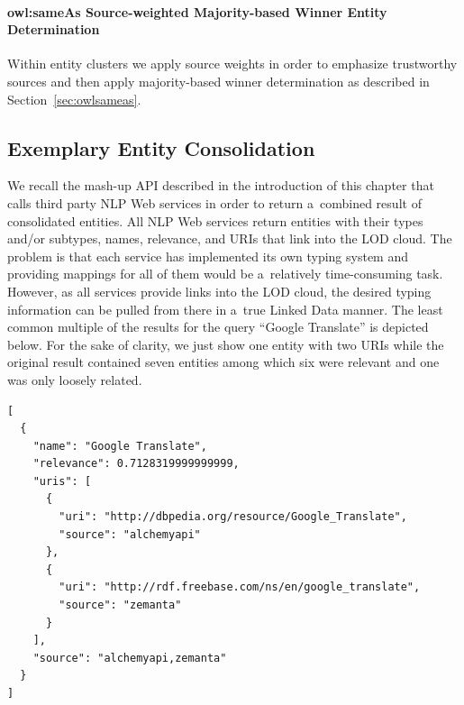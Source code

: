 \paragraph{owl:sameAs Source-weighted Majority-based Winner Entity Determination}
Within entity clusters we apply source weights in order to emphasize trustworthy sources and then apply
majority-based winner determination as described in Section~\ref{sec:owlsameas}.

\subsection{Exemplary Entity Consolidation}                     \label{sec:consolidation-nlp}
We recall the mash-up API described in the introduction of this chapter that calls third party NLP Web services in order to return a~combined result of consolidated entities.
All NLP Web services return entities with their types and/or subtypes, names,
relevance, and URIs that link into the LOD cloud. The problem is that each service has implemented its own typing
system and providing mappings for all of them would be a~relatively time-consuming task. However, as all services
provide links into the LOD cloud, the desired typing information can be pulled from there in a~true Linked Data manner. The least common
multiple of the results for the query ``Google Translate'' is depicted below. For the sake of clarity, we just show one
entity with two URIs while the original result contained seven entities among which six were relevant and one was only loosely related.

\begin{lstlisting}
[
  {
    "name": "Google Translate",
    "relevance": 0.7128319999999999,
    "uris": [
      {
        "uri": "http://dbpedia.org/resource/Google_Translate",
        "source": "alchemyapi"
      },
      {
        "uri": "http://rdf.freebase.com/ns/en/google_translate",
        "source": "zemanta"
      }
    ],
    "source": "alchemyapi,zemanta"
  }
]
\end{lstlisting}

